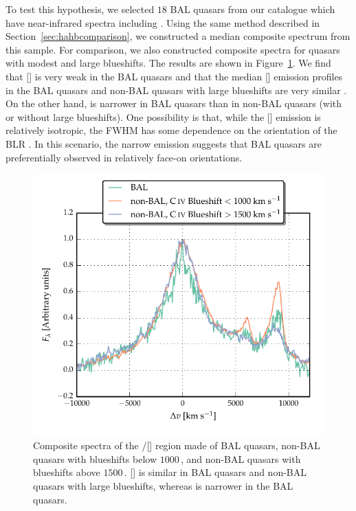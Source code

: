 To test this hypothesis, we selected $18$  BAL quasars from our catalogue which have near-infrared spectra including \hbns. 
Using the same method described in Section~\ref{sec:hahbcomparison}, we constructed a median composite spectrum from this sample. 
For comparison, we also constructed composite spectra for quasars with modest and large  blueshifts. 
The results are shown in Figure~\ref{fig:bal_composite}. 
We find that [] is very weak in the BAL quasars and that the median [] emission profiles in the BAL quasars and non-BAL quasars with large  blueshifts are very similar \citep[e.g.][]{yuan03}.
On the other hand, \hb is narrower in BAL quasars than in non-BAL quasars (with or without large  blueshifts).
One possibility is that, while the [] emission is relatively isotropic, the \hb FWHM has some dependence on the orientation of the BLR \citep[e.g.][]{shen14}.
In this scenario, the narrow \hb emission suggests that BAL quasars are preferentially observed in relatively face-on orientations. 

\begin{figure}[t!]
    \centering
    \includegraphics[width=0.8\linewidth]{figures/chapter04/bal_composite.pdf}
    \caption[{Composite spectra of the \hbns/[] region for BAL and non-BAL quasars.}]{Composite spectra of the \hbns/[] region made of BAL quasars, non-BAL quasars with  blueshifts below $1000$\,\kms, and non-BAL quasars with  blueshifts above $1500$\,\kms. [] is similar in BAL quasars and non-BAL quasars with large  blueshifts, whereas \hb is narrower in the BAL quasars.}
    \label{fig:bal_composite}
\end{figure}

